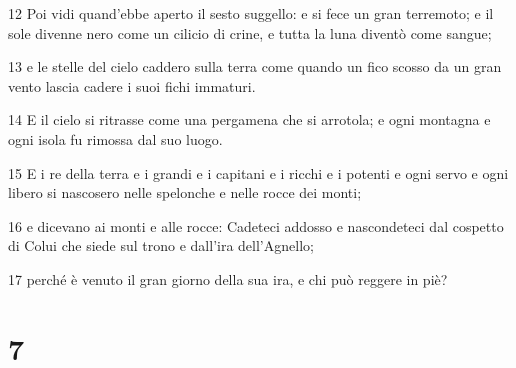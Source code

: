 \par 12 Poi vidi quand'ebbe aperto il sesto suggello: e si fece un gran terremoto; e il sole divenne nero come un cilicio di crine, e tutta la luna diventò come sangue;
\par 13 e le stelle del cielo caddero sulla terra come quando un fico scosso da un gran vento lascia cadere i suoi fichi immaturi.
\par 14 E il cielo si ritrasse come una pergamena che si arrotola; e ogni montagna e ogni isola fu rimossa dal suo luogo.
\par 15 E i re della terra e i grandi e i capitani e i ricchi e i potenti e ogni servo e ogni libero si nascosero nelle spelonche e nelle rocce dei monti;
\par 16 e dicevano ai monti e alle rocce: Cadeteci addosso e nascondeteci dal cospetto di Colui che siede sul trono e dall'ira dell'Agnello;
\par 17 perché è venuto il gran giorno della sua ira, e chi può reggere in piè?

\chapter{7}

